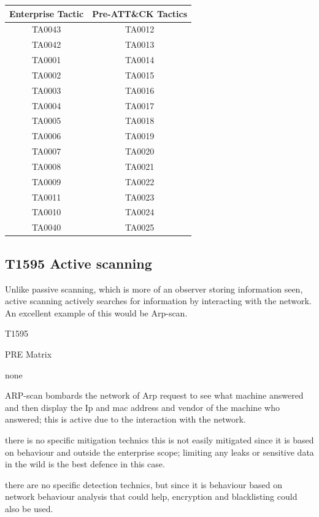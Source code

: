 \begin{table}[h!]
  \begin{center}
    \label{tab:table1}
    \begin{tabular}{c c}
      \toprule
      \textbf{Enterprise Tactic} & \textbf{Pre-ATT\&CK Tactics} \\
      \midrule
      TA0043 & TA0012\\
      TA0042 & TA0013\\
      TA0001 & TA0014\\
      TA0002 & TA0015\\
      TA0003 & TA0016\\
      TA0004 & TA0017\\
      TA0005 & TA0018\\
      TA0006 & TA0019\\
      TA0007 & TA0020\\
      TA0008 & TA0021\\
      TA0009 & TA0022\\
      TA0011 & TA0023\\
      TA0010 & TA0024\\
      TA0040 & TA0025\\
      \bottomrule
    \end{tabular}
  \end{center}
\end{table}

\subsection{T1595 Active scanning}
\label{lab3-tactics}
Unlike passive scanning, which is more of an observer storing information seen,
active scanning actively searches for information by interacting with the
network. An excellent example of this would be Arp-scan.
  \begin{description}[align=left]
    \item [Unique Identifier:] T1595
    \item [Platforms Affected:] PRE Matrix
    \item [Permissions Required:] none
    \item [Procedure Examples:] ARP-scan bombards the network of Arp request
    to see what machine answered and then display the Ip and mac address and
    vendor of the machine who answered; this is active due to the interaction
    with the network.
    \item [Mitigation Technique:] there is no specific mitigation technics
    this is not easily mitigated since it is based on behaviour and outside the
    enterprise scope; limiting any leaks or sensitive data in the wild is the
    best defence in this case.
    \item [Detection Technique:] there are no specific detection technics,
    but since it is behaviour based on network behaviour analysis that could
    help, encryption and blacklisting could also be used.
  \end{description}

